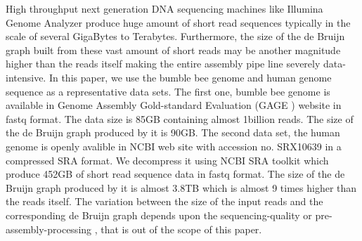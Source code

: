 High throughput next generation DNA sequencing machines like Illumina Genome Analyzer produce huge amount of short read sequences typically in the scale of several GigaBytes to Terabytes.
Furthermore, the size of the de Bruijn graph built from these vast amount of short reads may be another magnitude higher than the reads itself making the entire assembly pipe line severely data-intensive.
In this paper, we use the bumble bee genome and human genome sequence as a representative data sets.
The first one, bumble bee genome is available in Genome Assembly Gold-standard Evaluation (GAGE \cite{bio:gage}) website in fastq format.
The data size is 85GB containing almost 1billion reads.
The size of the de Bruijn graph produced by it is 90GB.
The second data set, the human genome is openly avalible in NCBI web site with accession no. SRX10639 in a compressed SRA format.
We decompress it using NCBI SRA toolkit which produce 452GB of short read sequence data in fastq format.
The size of the de Bruijn graph produced by it is almost 3.8TB which is almost 9 times higher than the reads itself.
The variation between the size of the input reads and the corresponding de Bruijn graph depends upon the sequencing-quality or pre-assembly-processing \cite{bio:quality1}, \cite{bio:quality2} that is out of the scope of this paper. 




